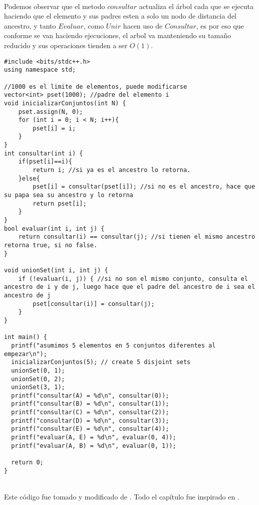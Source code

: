 \\Podemos observar que el metodo $consultar$ actualiza el árbol cada que se ejecuta haciendo que el elemento y sus padres esten a solo un nodo de distancia del ancestro, y tanto $Evaluar$, como $Unir$ hacen uso de $Consultar$, es por eso que conforme se van haciendo ejecuciones, el arbol va manteniendo su tamaño reducido y sus operaciones tienden a ser $O(1)$.
\\\begin{minipage}{\textwidth}
\begin{lstlisting}[style=C,caption=unionFind.cpp]
#include <bits/stdc++.h>
using namespace std;

//1000 es el limite de elementos, puede modificarse
vector<int> pset(1000); //padre del elemento i
void inicializarConjuntos(int N) {
    pset.assign(N, 0);
    for (int i = 0; i < N; i++){
        pset[i] = i;
    }
}
int consultar(int i) {
    if(pset[i]==i){
        return i; //si ya es el ancestro lo retorna.
    }else{
        pset[i] = consultar(pset[i]); //si no es el ancestro, hace que su papa sea su ancestro y lo retorna
        return pset[i];
    }
}
bool evaluar(int i, int j) {
    return consultar(i) == consultar(j); //si tienen el mismo ancestro retorna true, si no false.
}

void unionSet(int i, int j) {
    if (!evaluar(i, j)) { //si no son el mismo conjunto, consulta el ancestro de i y de j, luego hace que el padre del ancestro de i sea el ancestro de j
        pset[consultar(i)] = consultar(j);
    }
}

int main() {
  printf("asumimos 5 elementos en 5 conjuntos diferentes al empezar\n");
  inicializarConjuntos(5); // create 5 disjoint sets
  unionSet(0, 1);
  unionSet(0, 2);
  unionSet(3, 1);
  printf("consultar(A) = %d\n", consultar(0));
  printf("consultar(B) = %d\n", consultar(1));
  printf("consultar(C) = %d\n", consultar(2));
  printf("consultar(D) = %d\n", consultar(3));
  printf("consultar(E) = %d\n", consultar(4));
  printf("evaluar(A, E) = %d\n", evaluar(0, 4));
  printf("evaluar(A, B) = %d\n", evaluar(0, 1));

  return 0;
}
\end{lstlisting}
\end{minipage}
\\Este código fue tomado y modificado de \cite{disjointSet:Online}. Todo el capítulo fue inspirado en \cite{CompetitiveProgramming3}.